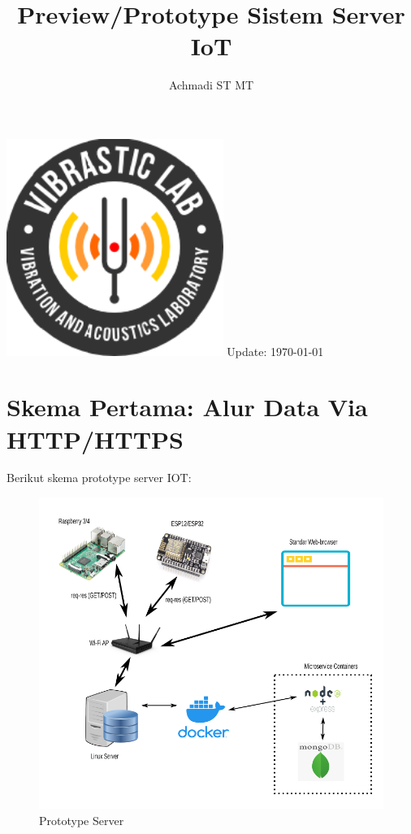 \documentclass[12pt,]{article}
\title{\LARGE \bf
	Preview/Prototype Sistem Server IoT\\
}
\author{Achmadi ST MT}
\date{}
\begin{document}
	\thispagestyle{empty}
	
	\begin{titlepage}
		\centering
		\vfill
		\vfill
		\maketitle
		\vfill
		\includegraphics[width=200pt]{images/logoviblab}
		\vfill
		\vfill
		Update: {\today} \currenttime \\
	\end{titlepage}
	
	
	\section{Skema Pertama: Alur Data Via HTTP/HTTPS}
	
	Berikut skema prototype server IOT:
	
	\begin{figure}[!ht]
		\centering
		\includegraphics[width=500pt]{images/preview}
		\caption{Prototype Server}
	\end{figure}
\end{document}

